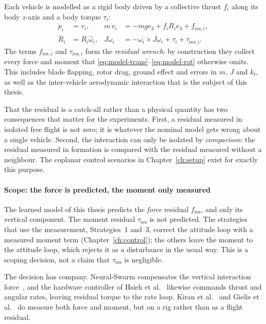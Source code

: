 Each vehicle is modelled as a rigid body driven by a collective thrust $f_i$ along its body
$z$-axis and a body torque $\tau_i$:
%
\begin{align}
  \dot{p}_i &= v_i, &
  m\,\dot{v}_i &= -m g e_3 + f_i R_i e_3 + f_{\mathrm{res},i}, \label{eq:model-trans}\\
  \dot{R}_i &= R_i \hat{\omega}_i, &
  J\dot{\omega}_i &= -\omega_i \times J\omega_i + \tau_i + \tau_{\mathrm{res},i}.
  \label{eq:model-rot}
\end{align}
%
The terms $f_{\mathrm{res},i}$ and $\tau_{\mathrm{res},i}$ form the \emph{residual wrench}: by
construction they collect every force and moment that \eqref{eq:model-trans}--\eqref{eq:model-rot}
otherwise omits. This includes blade flapping, rotor drag, ground effect and errors in $m$, $J$ and
$k_t$, as well as the inter-vehicle aerodynamic interaction that is the subject of this thesis.

That the residual is a catch-all rather than a physical quantity has two consequences that matter
for the experiments. First, a residual measured in isolated free flight is not zero; it is whatever
the nominal model gets wrong about a single vehicle. Second, the interaction can only be isolated
by \emph{comparison}: the residual measured in formation is compared with the residual measured
without a neighbour. The coplanar control scenarios in Chapter~\ref{ch:setup} exist for exactly
this purpose.

\paragraph{Scope: the force is predicted, the moment only measured}

The learned model of this thesis predicts the \emph{force} residual $f_{\mathrm{res}}$, and only its
vertical component. The moment residual $\tau_{\mathrm{res}}$ is not predicted. The strategies that
use the measurement, Strategies~1 and~3, correct the attitude loop with a measured moment term
(Chapter~\ref{ch:control}); the others leave the moment to the attitude loop, which rejects it as a
disturbance in the usual way. This is a scoping decision, not a claim that $\tau_{\mathrm{res}}$ is
negligible.

The decision has company. Neural-Swarm compensates the vertical interaction
force~\cite{shi2020neuralswarm}, and the hardware controller of Hsieh et
al.~\cite{hsieh2026flatness} likewise commands thrust and angular rates, leaving residual torque to
the rate loop. Kiran et al.~\cite{kiran2025downwash} and Gielis et al.~\cite{gielis2023aggregate}
do measure both force and moment, but on a rig rather than as a flight residual.

